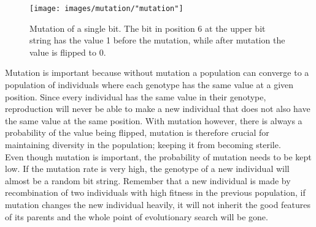 \begin{figure}[h!]
\begin{center}
\texttt{[image: images/mutation/"mutation"]}
\caption{Mutation of a single bit. The bit in position 6 at the upper bit string has the value 1 before the mutation, while after mutation the value is flipped to 0.}
\label{Mutation}
\end{center}
\end{figure}


\noindent Mutation is important because without mutation a population can converge to a population of individuals where each genotype has the same value at a given position. Since every individual has the same value in their genotype, reproduction will never be able to make a new individual that does not also have the same value at the same position. With mutation however, there is always a probability of the value being flipped, mutation is therefore crucial for maintaining diversity in the population; keeping it from becoming sterile.\\


\noindent Even though mutation is important, the probability of mutation needs to be kept low. If the mutation rate is very high, the genotype of a new individual will almost be a random bit string. Remember that a new individual is made by recombination of two individuals with high fitness in the previous population, if mutation changes the new individual heavily, it will not inherit the good features of its parents and the whole point of evolutionary search will be gone.\\


